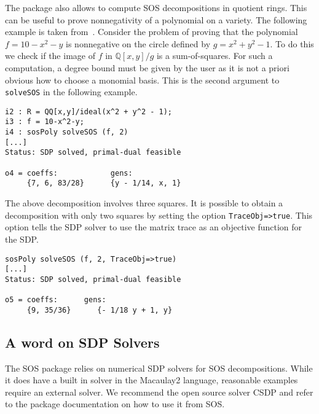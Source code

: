 \documentclass[11pt]{amsart}
\theoremstyle{plain}%
\theoremstyle{definition}
\theoremstyle{remark}
\newcommand{\Mac}{Macaulay2\xspace}
\newcommand{\SOS}{\textsc{SOS}\xspace}
\newcommand{\QQ}{\mathbb{Q}}
\begin{document}
The package also allows to compute SOS decompositions in quotient rings.
This can be useful to prove nonnegativity of a polynomial on a variety.  
The following example is taken from~\cite{parrilo2005exploiting}.  
Consider the problem of proving that the polynomial $f = 10-x^2-y$ is nonnegative on the circle defined by $g = x^2 + y^2 - 1$.
To do this we check if the image of $f$ in $\QQ[x,y]/g$ is a sum-of-squares.
For such a computation, a degree bound must be given by the user as it is not a priori obvious how to choose a monomial basis.
This is the second argument to \verb|solveSOS| in the following example.
{\small
\begin{verbatim}
i2 : R = QQ[x,y]/ideal(x^2 + y^2 - 1);
i3 : f = 10-x^2-y;
i4 : sosPoly solveSOS (f, 2)
[...]
Status: SDP solved, primal-dual feasible

o4 = coeffs:            gens:         
     {7, 6, 83/28}      {y - 1/14, x, 1}
\end{verbatim}
}
The above decomposition involves three squares.
It is possible to obtain a decomposition with only two squares by setting the option \verb|TraceObj=>true|.
This option tells the SDP solver to use the matrix trace as an objective function for the SDP.
{\small
\begin{verbatim}
sosPoly solveSOS (f, 2, TraceObj=>true)
[...]
Status: SDP solved, primal-dual feasible

o5 = coeffs:      gens:          
     {9, 35/36}      {- 1/18 y + 1, y} 
\end{verbatim}
}


\subsection*{A word on SDP Solvers}
The \SOS package relies on numerical SDP solvers for SOS
decompositions.  While it does have a built in solver in the \Mac
language, reasonable examples require an external solver.  We
recommend the open source solver CSDP \cite{borchers1999csdp} and
refer to the package documentation on how to use it from \SOS.
\end{document}
